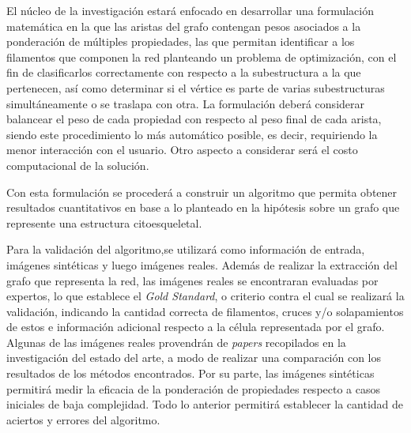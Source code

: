 \documentclass{article}
\begin{document}
El n\'ucleo de la investigaci\'on estar\'a enfocado en desarrollar una formulaci\'on matem\'atica en la que las aristas del grafo contengan pesos asociados a la ponderaci\'on de m\'ultiples propiedades, las que permitan identificar a los filamentos que componen la red planteando un problema de optimizaci\'on, con el fin de clasificarlos correctamente con respecto a la subestructura a la que pertenecen, as\'i como determinar si el v\'ertice es parte de varias subestructuras simult\'aneamente o se traslapa con otra.
La formulaci\'on deber\'a considerar balancear el peso de cada propiedad con respecto al peso final de cada arista, siendo este procedimiento lo m\'as autom\'atico posible, es decir, requiriendo la menor interacci\'on con el usuario. Otro aspecto a considerar ser\'a el costo computacional de la soluci\'on.

Con esta formulaci\'on se proceder\'a a construir un algoritmo que permita obtener resultados cuantitativos en base a lo planteado en la hip\'otesis sobre un grafo que represente una estructura citoesqueletal. 


Para la validaci\'on del algoritmo,se utilizar\'a como informaci\'on de entrada, im\'agenes sint\'eticas y luego im\'agenes reales. Adem\'as de realizar la extracci\'on del grafo que representa la red, las im\'agenes reales se encontraran evaluadas por expertos, lo que establece el \textit{Gold Standard}, o criterio contra el cual se realizar\'a la validaci\'on, indicando la cantidad correcta de filamentos, cruces y/o solapamientos de estos e informaci\'on adicional respecto a la c\'elula representada por el grafo.
Algunas de las im\'agenes reales provendr\'an de {\it papers} recopilados en la investigaci\'on del estado del arte, a modo de realizar una comparaci\'on con los resultados de los m\'etodos encontrados. Por su parte, las im\'agenes sint\'eticas permitir\'a medir la eficacia de la ponderaci\'on de propiedades respecto a casos iniciales de baja complejidad. Todo lo anterior permitir\'a establecer la cantidad de aciertos y errores del algoritmo.







\end{document}
